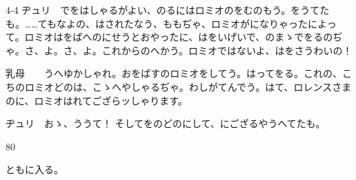 \documentclass[tate,paper=b6j,jafontsize=9pt]{jlreq}
\begin{document}
\begin{azconvIndented}{4\zw}{-4\zw}
ヂュリ　でをはしゃるがよい、のるにはロミオのをむのもう。をうてたも。……てもなよの、はされたなう、ももぢゃ、ロミオがになりゃったによって。ロミオはをばへのにせうとおやったに、はをいげいで、のまゝでをるのぢゃ。さ、よ。さ、よ。これからのへかう。ロミオではないよ、はをさうわいの！

乳母　　うへゆかしゃれ。おをばすのロミオをしてう。はってをる。これの、こちのロミオどのは、こゝへやしゃるぢゃ。わしがてんでう。はて、ロレンスさまのに、ロミオはれてござらッしゃります。

ヂュリ　おゝ、ううて！ そしてをのどのにして、にござるやうへてたも。

\end{azconvIndented}
\begin{azconvIndented}{8\zw}{0\zw}

ともに入る。

\end{azconvIndented}

\end{document}
